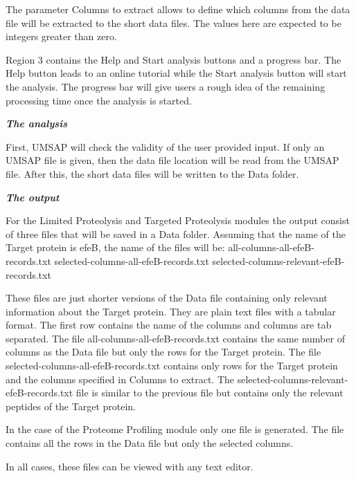 The parameter Columns to extract allows to define which columns from the data file will be extracted to the short data files. The values here are expected to be integers greater than zero.

Region \num{3} contains the Help and Start analysis buttons and a progress bar. The Help button leads to an online tutorial while the Start analysis button will start the analysis. The progress bar will give users a rough idea of the remaining processing time once the analysis is started.

\textit{\textbf{The analysis}}

First, UMSAP will check the validity of the user provided input. If only an UMSAP file is given, then the data file location will be read from the UMSAP file. After this, the short data files will be written to the Data folder.

\textit{\textbf{The output}}

For the Limited Proteolysis and Targeted Proteolysis modules the output consist of three files that will be saved in a Data folder. Assuming that the name of the Target protein is efeB, the name of the files will be:\newline 
all-columns-all-efeB-records.txt \newline
selected-columns-all-efeB-records.txt \newline
selected-columns-relevant-efeB-records.txt

These files are just shorter versions of the Data file containing only relevant information about the Target protein. They are plain text files with a tabular format. The first row contains the name of the columns and columns are tab separated. The file all-columns-all-efeB-records.txt contains the same number of columns as the Data file but only the rows for the Target protein. The file selected-columns-all-efeB-records.txt contains only rows for the Target protein and the columns specified in Columns to extract. The selected-columns-relevant-efeB-records.txt file is similar to the previous file but contains only the relevant peptides of the Target protein. 

In the case of the Proteome Profiling module only one file is generated. The file contains all the rows in the Data file but only the selected columns.

In all cases, these files can be viewed with any text editor.





